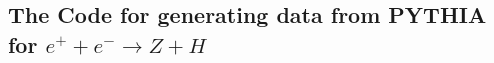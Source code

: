 \begin{appendices}
\chapter{\label{appendix}The Code for generating data from
PYTHIA for $e^{+}+e^{-}\rightarrow Z + H$}
\end{appendices}

\setcounter{equation}{0}
\setcounter{table}{0}
\setcounter{figure}{0}
\baselineskip 10pt



